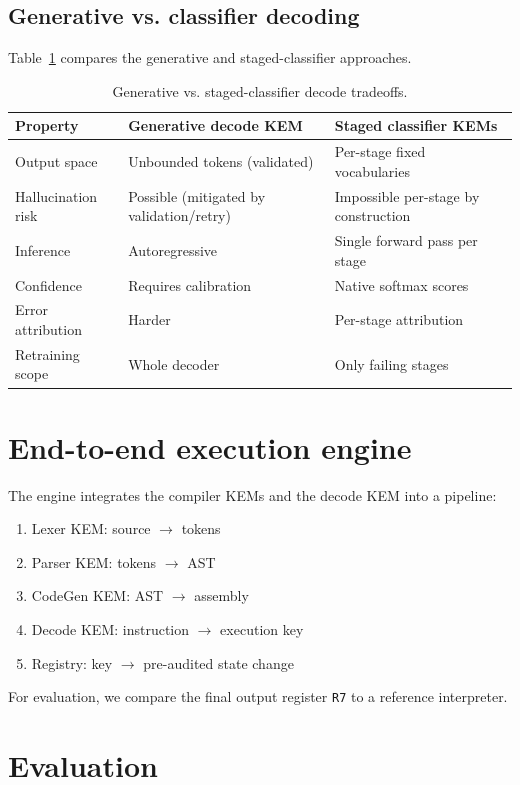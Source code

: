 \documentclass[11pt]{article}
\begin{document}
\subsection{Generative vs. classifier decoding}
Table~\ref{tab:gen_vs_cls} compares the generative and staged-classifier approaches.
\begin{table}[h]
\centering
\caption{Generative vs. staged-classifier decode tradeoffs.}
\label{tab:gen_vs_cls}
\begin{tabular}{lp{5.2cm}p{5.2cm}}
\toprule
Property & Generative decode KEM & Staged classifier KEMs \\
\midrule
Output space & Unbounded tokens (validated) & Per-stage fixed vocabularies \\
Hallucination risk & Possible (mitigated by validation/retry) & Impossible per-stage by construction \\
Inference & Autoregressive & Single forward pass per stage \\
Confidence & Requires calibration & Native softmax scores \\
Error attribution & Harder & Per-stage attribution \\
Retraining scope & Whole decoder & Only failing stages \\
\bottomrule
\end{tabular}
\end{table}

\section{End-to-end execution engine}\label{sec:e2e}
The engine integrates the compiler KEMs and the decode KEM into a pipeline:
\begin{enumerate}[leftmargin=*]
  \item Lexer KEM: source $\rightarrow$ tokens
  \item Parser KEM: tokens $\rightarrow$ AST
  \item CodeGen KEM: AST $\rightarrow$ assembly
  \item Decode KEM: instruction $\rightarrow$ execution key
  \item Registry: key $\rightarrow$ pre-audited state change
\end{enumerate}
For evaluation, we compare the final output register \texttt{R7} to a reference interpreter.

\section{Evaluation}\label{sec:evaluation}
\end{document}
